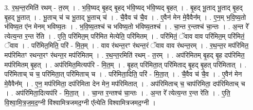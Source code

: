 \documentclass[17pt]{extarticle}
\begin{document}
3. र॒थ॒न्त॒रमिति॑ रथम् - त॒रम् । . भ॒वि॒ष्यद् बृ॒हद् बृ॒हद् भ॑वि॒ष्यद् भ॑वि॒ष्यद् बृ॒हत् । . बृ॒हद् भू॒ताद् भू॒ताद् बृ॒हद् बृ॒हद् भू॒तात् । . भू॒ताच् च॑ च भू॒ताद् भू॒ताच् च॑ । . चै॒वैव च॑ चै॒व । . ए॒वैन॑ मेन मे॒वैवैन᳚म् । . ए॒न॒म् भ॒वि॒ष्य॒तो भ॑विष्य॒त ए॑न मेनम् भविष्य॒तः । . भ॒वि॒ष्य॒तश्च॑ च भविष्य॒तो भ॑विष्य॒तश्च॑ । . चा॒न्त र॒न्तश्च॑ चा॒न्तः । . अ॒न्त रे᳚ त्येत्य॒न्त र॒न्त रे॑ति । . ए॒ति॒ परि॑मित॒म् परि॑मित मेत्येति॒ परि॑मितम् । . परि॑मितं॒ ॅवाव वाव परि॑मित॒म् परि॑मितं॒ ॅवाव । . परि॑मित॒मिति॒ परि॑ - मि॒त॒म् । . वाव र॑थन्त॒रꣳ र॑थन्त॒रं ॅवाव वाव र॑थन्त॒रम् । . र॒थ॒न्त॒र मप॑रिमित॒ मप॑रिमितꣳ रथन्त॒रꣳ र॑थन्त॒र मप॑रिमितम् । . र॒थ॒न्त॒रमिति॑ रथम् - त॒रम् । . अप॑रिमितम् बृ॒हद् बृ॒ह दप॑रिमित॒ मप॑रिमितम् बृ॒हत् । . अप॑रिमित॒मित्यप॑रि - मि॒त॒म् । . बृ॒हत् परि॑मिता॒त् परि॑मिताद् बृ॒हद् बृ॒हत् परि॑मितात् । . परि॑मिताच् च च॒ परि॑मिता॒त् परि॑मिताच् च । . परि॑मिता॒दिति॒ परि॑ - मि॒ता॒त् । . चै॒वैव च॑ चै॒व । . ए॒वैन॑ मेन मे॒वैवैन᳚म् । . ए॒न॒ मप॑रिमिता॒ दप॑रिमिता देन मेन॒ मप॑रिमितात् । . अप॑रिमिताच् च॒ चाप॑रिमिता॒ दप॑रिमिताच् च । . अप॑रिमिता॒दित्यप॑रि - मि॒ता॒त् । . चा॒न्त र॒न्तश्च॑ चा॒न्तः । . अ॒न्त रे᳚ त्येत्य॒न्त र॒न्त रे॑ति । . ए॒ति॒ वि॒श्वा॒मि॒त्र॒ज॒म॒द॒ग्नी वि॑श्वामित्रजमद॒ग्नी ए᳚त्येति विश्वामित्रजमद॒ग्नी । \newline
\end{document}
